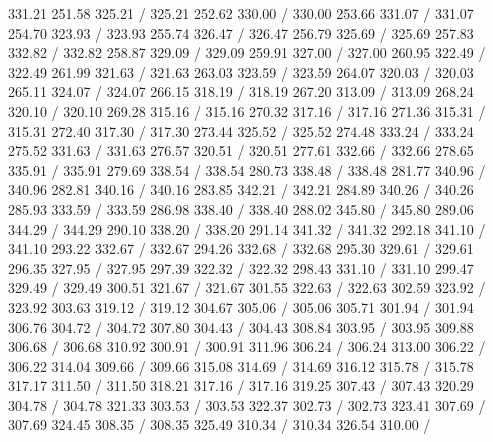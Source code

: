 { 331.21 251.58 325.21 /
 325.21 252.62 330.00 /
 330.00 253.66 331.07 /
 331.07 254.70 323.93 /
 323.93 255.74 326.47 /
 326.47 256.79 325.69 /
 325.69 257.83 332.82 /
 332.82 258.87 329.09 /
 329.09 259.91 327.00 /
 327.00 260.95 322.49 /
 322.49 261.99 321.63 /
 321.63 263.03 323.59 /
 323.59 264.07 320.03 /
 320.03 265.11 324.07 /
 324.07 266.15 318.19 /
 318.19 267.20 313.09 /
 313.09 268.24 320.10 /
 320.10 269.28 315.16 /
 315.16 270.32 317.16 /
 317.16 271.36 315.31 /
 315.31 272.40 317.30 /
 317.30 273.44 325.52 /
 325.52 274.48 333.24 /
 333.24 275.52 331.63 /
 331.63 276.57 320.51 /
 320.51 277.61 332.66 /
 332.66 278.65 335.91 /
 335.91 279.69 338.54 /
 338.54 280.73 338.48 /
 338.48 281.77 340.96 /
 340.96 282.81 340.16 /
 340.16 283.85 342.21 /
 342.21 284.89 340.26 /
 340.26 285.93 333.59 /
 333.59 286.98 338.40 /
 338.40 288.02 345.80 /
 345.80 289.06 344.29 /
 344.29 290.10 338.20 /
 338.20 291.14 341.32 /
 341.32 292.18 341.10 /
 341.10 293.22 332.67 /
 332.67 294.26 332.68 /
 332.68 295.30 329.61 /
 329.61 296.35 327.95 /
 327.95 297.39 322.32 /
 322.32 298.43 331.10 /
 331.10 299.47 329.49 /
 329.49 300.51 321.67 /
 321.67 301.55 322.63 /
 322.63 302.59 323.92 /
 323.92 303.63 319.12 /
 319.12 304.67 305.06 /
 305.06 305.71 301.94 /
 301.94 306.76 304.72 /
 304.72 307.80 304.43 /
 304.43 308.84 303.95 /
 303.95 309.88 306.68 /
 306.68 310.92 300.91 /
 300.91 311.96 306.24 /
 306.24 313.00 306.22 /
 306.22 314.04 309.66 /
 309.66 315.08 314.69 /
 314.69 316.12 315.78 /
 315.78 317.17 311.50 /
 311.50 318.21 317.16 /
 317.16 319.25 307.43 /
 307.43 320.29 304.78 /
 304.78 321.33 303.53 /
 303.53 322.37 302.73 /
 302.73 323.41 307.69 /
 307.69 324.45 308.35 /
 308.35 325.49 310.34 /
 310.34 326.54 310.00 /
}
